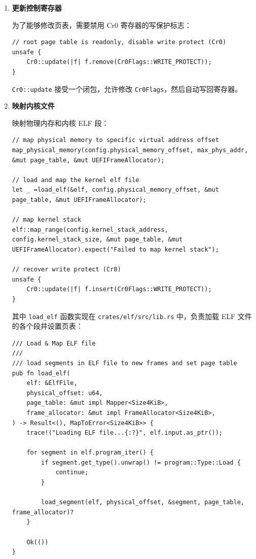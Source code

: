 \documentclass{SYSUReport}
\begin{document}
\begin{enumerate}[label={\chinese*、},labelsep=0pt, start=2]
    \item \textbf{更新控制寄存器}

    为了能够修改页表，需要禁用 Cr0 寄存器的写保护标志：

    \begin{verbatim}
// root page table is readonly, disable write protect (Cr0)
unsafe {
    Cr0::update(|f| f.remove(Cr0Flags::WRITE_PROTECT));
}
    \end{verbatim}

    \texttt{Cr0::update} 接受一个闭包，允许修改 \texttt{Cr0Flags}，然后自动写回寄存器。

    \item \textbf{映射内核文件}

    映射物理内存和内核 ELF 段：

    \begin{verbatim}
// map physical memory to specific virtual address offset
map_physical_memory(config.physical_memory_offset, max_phys_addr, &mut page_table, &mut UEFIFrameAllocator);

// load and map the kernel elf file
let _ =load_elf(&elf, config.physical_memory_offset, &mut page_table, &mut UEFIFrameAllocator);

// map kernel stack
elf::map_range(config.kernel_stack_address, config.kernel_stack_size, &mut page_table, &mut UEFIFrameAllocator).expect("Failed to map kernel stack");

// recover write protect (Cr0)
unsafe {
    Cr0::update(|f| f.insert(Cr0Flags::WRITE_PROTECT));
}
    \end{verbatim}

    其中 \texttt{load\_elf} 函数实现在 \texttt{crates/elf/src/lib.rs} 中，负责加载 ELF 文件的各个段并设置页表：

    \begin{verbatim}
/// Load & Map ELF file
///
/// load segments in ELF file to new frames and set page table
pub fn load_elf(
    elf: &ElfFile,
    physical_offset: u64,
    page_table: &mut impl Mapper<Size4KiB>,
    frame_allocator: &mut impl FrameAllocator<Size4KiB>,
) -> Result<(), MapToError<Size4KiB>> {
    trace!("Loading ELF file...{:?}", elf.input.as_ptr());

    for segment in elf.program_iter() {
        if segment.get_type().unwrap() != program::Type::Load {
            continue;
        }

        load_segment(elf, physical_offset, &segment, page_table, frame_allocator)?
    }

    Ok(())
}
    \end{verbatim}


\end{enumerate}
\end{document}
